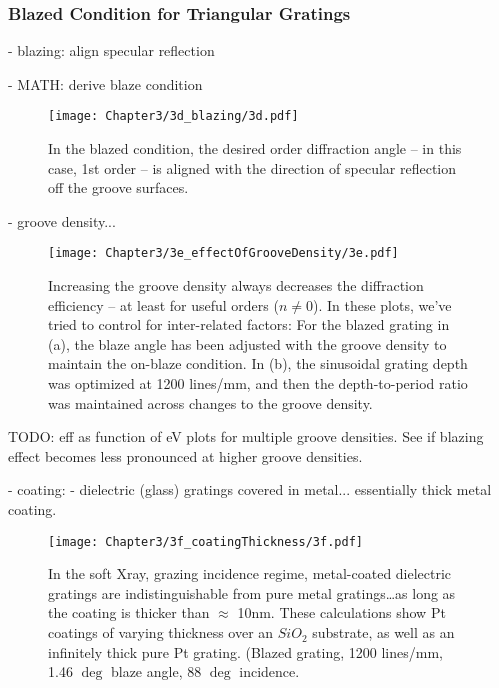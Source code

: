 \subsubsection{Blazed Condition for Triangular Gratings}
\label{blazeAngle}
          - blazing: align specular reflection
          
          	- MATH: derive blaze condition
	
\begin{figure}[htbp] %
   \centering
   \texttt{[image: Chapter3/3d\_blazing/3d.pdf]} 
   \caption{In the blazed condition, the desired order diffraction angle -- in this case, 1st order -- is aligned with the direction of specular reflection off the groove surfaces.}
   \label{3d}
\end{figure}

	- groove density...
	
\begin{figure}[htbp] %
   \centering
   \texttt{[image: Chapter3/3e\_effectOfGrooveDensity/3e.pdf]} 
   \caption{Increasing the groove density always decreases the diffraction efficiency -- at least for useful orders ($n \neq 0$).  In these plots, we've tried to control for inter-related factors: For the blazed grating in (a), the blaze angle has been adjusted with the groove density to maintain the on-blaze condition.  In (b), the sinusoidal grating depth was optimized at 1200 lines/mm, and then the depth-to-period ratio was maintained across changes to the groove density.}
   \label{3e}
\end{figure}

TODO: eff as function of eV plots for multiple groove densities.  See if blazing effect becomes less pronounced at higher groove densities.


     - coating:
     	- dielectric (glass) gratings covered in metal... essentially thick metal coating. 
	
\begin{figure}[htbp] %
   \centering
   \texttt{[image: Chapter3/3f\_coatingThickness/3f.pdf]} 
   \caption{In the soft Xray, grazing incidence regime, metal-coated dielectric gratings are indistinguishable from pure metal gratings\ldots as long as the coating is thicker than $\approx$ 10nm.  These calculations show Pt coatings of varying thickness over an $SiO_2$ substrate, as well as an infinitely thick pure Pt grating.  (Blazed grating, 1200 lines/mm, 1.46 $\deg$ blaze angle, 88 $\deg$ incidence.}
   \label{3f}
\end{figure}

